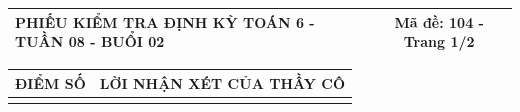 \documentclass[12pt,a4paper]{article}
\begin{document}
\newpage


\noindent
\begin{tabularx}{\linewidth}{|X|c|}
\hline
\textbf{PHIẾU KIỂM TRA ĐỊNH KỲ TOÁN 6 - TUẦN 08 - BUỔI 02} & \textbf{Mã đề: 104 - Trang 1/2} \\
\hline
\end{tabularx}

\vspace{1mm}

\noindent
\begin{tabularx}{\linewidth}{|p{3.2cm}|X|}
\hline
\centering\textbf{ĐIỂM SỐ} & \centering\textbf{LỜI NHẬN XÉT CỦA THẦY CÔ} \tabularnewline
\hline
\rule{0pt}{1.8cm} & \tabularnewline
\hline
\end{tabularx}

\vspace{1.2mm}
\end{document}
